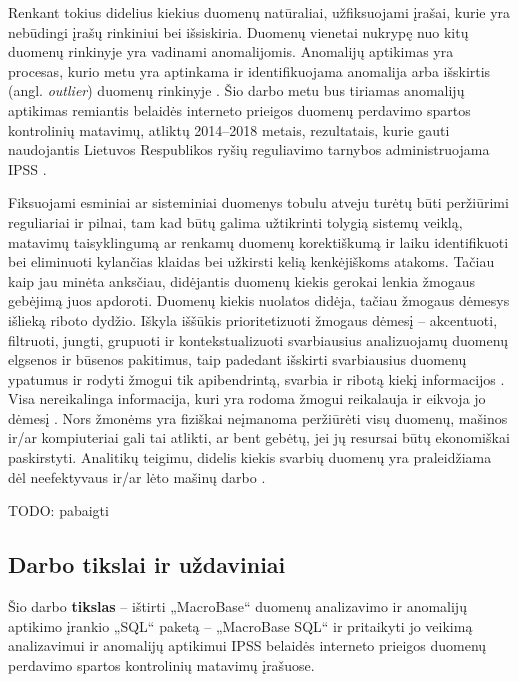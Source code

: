 \documentclass{VUMIFPSbakalaurinis}
\begin{document}
Renkant tokius didelius kiekius duomenų natūraliai, užfiksuojami įrašai, kurie yra nebūdingi įrašų rinkiniui bei išsiskiria. Duomenų vienetai nukrypę nuo kitų duomenų rinkinyje yra vadinami anomalijomis. Anomalijų aptikimas yra procesas, kurio metu yra aptinkama ir identifikuojama anomalija arba išskirtis (angl. \textit{outlier}) duomenų rinkinyje \cite{anomaly}. Šio darbo metu bus tiriamas anomalijų aptikimas remiantis belaidės interneto prieigos duomenų perdavimo spartos kontrolinių matavimų, atliktų 2014–2018 metais, rezultatais, kurie gauti naudojantis Lietuvos Respublikos ryšių reguliavimo tarnybos administruojama IPSS \cite{ipss}.\par

Fiksuojami esminiai ar sisteminiai duomenys tobulu atveju turėtų būti peržiūrimi reguliariai ir pilnai, tam kad būtų galima užtikrinti tolygią sistemų veiklą, matavimų taisyklingumą ar renkamų duomenų korektiškumą ir laiku identifikuoti bei eliminuoti kylančias klaidas bei užkirsti kelią kenkėjiškoms atakoms. Tačiau kaip jau minėta anksčiau, didėjantis duomenų kiekis gerokai lenkia žmogaus gebėjimą juos apdoroti. Duomenų kiekis nuolatos didėja, tačiau žmogaus dėmesys išlieką riboto dydžio. Iškyla iššūkis prioritetizuoti žmogaus dėmesį – akcentuoti, filtruoti, jungti, grupuoti ir kontekstualizuoti svarbiausius analizuojamų duomenų elgsenos ir būsenos pakitimus, taip padedant išskirti svarbiausius duomenų ypatumus ir rodyti žmogui tik apibendrintą, svarbia ir ribotą kiekį informacijos \cite{prioritizing_attention}. Visa nereikalinga informacija, kuri yra rodoma žmogui reikalauja ir eikvoja jo dėmesį \cite{attention}. Nors žmonėms yra fiziškai neįmanoma peržiūrėti visų duomenų, mašinos ir/ar kompiuteriai gali tai atlikti, ar bent gebėtų, jei jų resursai būtų ekonomiškai paskirstyti. Analitikų teigimu, didelis kiekis svarbių duomenų yra praleidžiama dėl neefektyvaus ir/ar lėto mašinų darbo \cite{prioritizing_attention}.\par

TODO: pabaigti



\subsection{Darbo tikslai ir uždaviniai}
Šio darbo \textbf{tikslas} – ištirti „MacroBase“ duomenų analizavimo ir anomalijų aptikimo įrankio „SQL“ paketą – „MacroBase SQL“ ir pritaikyti jo veikimą analizavimui ir anomalijų aptikimui IPSS belaidės interneto prieigos duomenų perdavimo spartos kontrolinių matavimų įrašuose.\par
\end{document}
